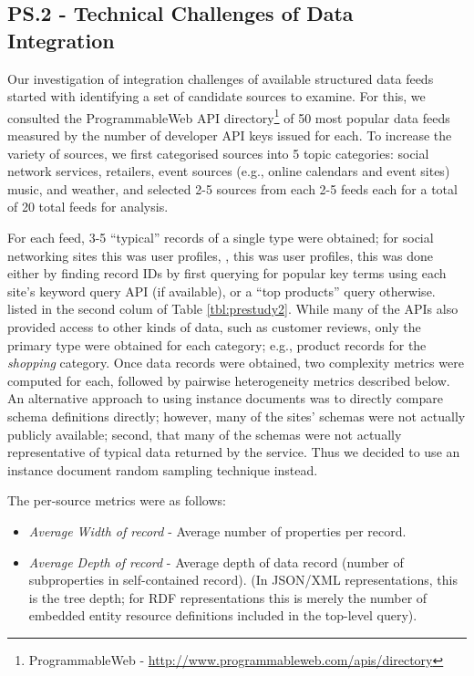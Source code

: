 \documentclass{sigchi}
\begin{document}
\subsection{PS.2 - Technical Challenges of Data Integration}
Our investigation of integration challenges of available structured data feeds started with identifying a set of candidate sources to examine.  For this, we consulted the ProgrammableWeb API directory\footnote{ProgrammableWeb - \url{http://www.programmableweb.com/apis/directory}} of 50 most popular data feeds measured by the number of developer API keys issued for each.  To increase the variety of sources, we first categorised sources into 5 topic categories: social network services, retailers, event sources (e.g., online calendars and event sites) music, and weather, and selected 2-5 sources from each 2-5 feeds each for a total of 20 total feeds for analysis.  

For each feed, 3-5 ``typical'' records of a single type were obtained; for social networking sites this was user profiles, , this was user profiles, this was done either by finding record IDs by first querying for popular key terms using each site's keyword query API (if available), or a ``top products'' query otherwise.  listed in the second colum of Table \ref{tbl:prestudy2}. While many of the APIs also provided access to other kinds of data, such as customer reviews, only the primary type were obtained for each category; e.g., product records for the \emph{shopping} category.  Once data records were obtained, two complexity metrics were computed for each, followed by pairwise heterogeneity metrics described below.  An alternative approach to using instance documents was to directly compare schema definitions directly; however, many of the sites' schemas were not actually publicly available; second, that many of the schemas were not actually representative of typical data returned by the service. Thus we decided to use an instance document random sampling technique instead.

The per-source metrics were as follows:
\begin{itemize}
\item \emph{Average Width of record} - Average number of properties per record.
\item \emph{Average Depth of record} - Average depth of data record (number of subproperties in self-contained record). (In JSON/XML representations, this is the tree depth; for RDF  representations this is merely the number of embedded entity resource definitions included in the top-level query).
\end{itemize}
\end{document}
